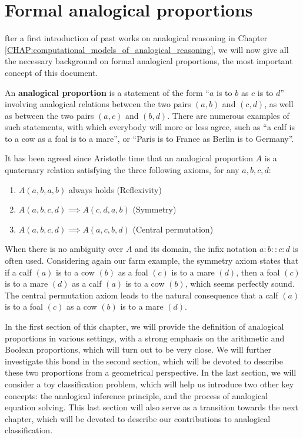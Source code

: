 \chapter{Formal analogical proportions}
\label{CHAP:formal_analogical_proportions}
\localtableofcontents*
\vspace*{\baselineskip}

fter a first introduction of past works on analogical reasoning in
Chapter \ref{CHAP:computational_models_of_analogical_reasoning}, we will now
give all the necessary background on formal analogical proportions, the most
important concept of this document.

An \textbf{analogical proportion} is a statement of the form ``$a$ is to $b$ as
$c$ is to $d$'' involving analogical relations between the two pairs $(a,b)$
and $(c,d)$, as well as between the two pairs $(a,c)$ and $(b,d)$.  There are
numerous examples of such statements, with which everybody will more or less
agree, such as  ``a calf is to a cow as a foal is to a mare'', or ``Paris is to
France as Berlin is to Germany''.

It has been agreed since Aristotle time that an analogical proportion $A$ is a
quaternary relation satisfying the three following axioms, for any $a, b, c,
d$:

\begin{enumerate}
\item $A(a,b,a,b)$ always holds (Reflexivity)
\item $A(a,b,c,d) \implies A(c,d,a,b)$ (Symmetry)
\item $A(a,b,c,d) \implies A(a,c,b,d)$ (Central permutation)
\end{enumerate}

When there is no ambiguity over $A$ and its domain, the infix notation
$a:b::c:d$ is often used. Considering again our farm example, the symmetry
axiom states that if a calf $(a)$ is to a cow $(b)$ as a foal $(c)$ is to a
mare $(d)$, then a foal $(c)$ is to a mare $(d)$ as a calf $(a)$ is to a cow
$(b)$, which seems perfectly sound. The central permutation axiom leads to the
natural consequence that a calf $(a)$ is to a foal $(c)$ as a cow $(b)$ is to a
mare $(d)$.

In the first section of this chapter, we will provide the definition of
analogical proportions in various settings, with a strong emphasis on the
arithmetic and Boolean proportions, which will turn out to be very close. We
will further investigate this bond in the second section, which will be devoted
to describe these two proportions from a geometrical perspective. In the last
section, we will consider a toy classification problem, which will help us
introduce two other key concepts: the analogical inference
principle, and the process of analogical equation solving. This last section
will also serve as a transition towards the next chapter, which will be devoted
to describe our contributions to analogical classification.

